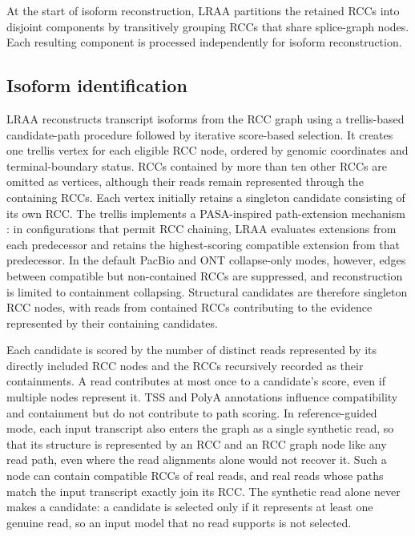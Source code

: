 At the start of isoform reconstruction, LRAA partitions the retained RCCs into disjoint components by transitively grouping RCCs that share splice-graph nodes. Each resulting component is processed independently for isoform reconstruction.

\subsection{Isoform identification}\label{isoform-identification}

LRAA reconstructs transcript isoforms from the RCC graph using a trellis-based candidate-path procedure followed by iterative score-based selection. It creates one trellis vertex for each eligible RCC node, ordered by genomic coordinates and terminal-boundary status. RCCs contained by more than ten other RCCs are omitted as vertices, although their reads remain represented through the containing RCCs. Each vertex initially retains a singleton candidate consisting of its own RCC. The trellis implements a PASA-inspired path-extension mechanism \citep{haas2003}: in configurations that permit RCC chaining, LRAA evaluates extensions from each predecessor and retains the highest-scoring compatible extension from that predecessor. In the default PacBio and ONT collapse-only modes, however, edges between compatible but non-contained RCCs are suppressed, and reconstruction is limited to containment collapsing. Structural candidates are therefore singleton RCC nodes, with reads from contained RCCs contributing to the evidence represented by their containing candidates.

Each candidate is scored by the number of distinct reads represented by its directly included RCC nodes and the RCCs recursively recorded as their containments. A read contributes at most once to a candidate's score, even if multiple nodes represent it. TSS and PolyA annotations influence compatibility and containment but do not contribute to path scoring. In reference-guided mode, each input transcript also enters the graph as a single synthetic read, so that its structure is represented by an RCC and an RCC graph node like any read path, even where the read alignments alone would not recover it. Such a node can contain compatible RCCs of real reads, and real reads whose paths match the input transcript exactly join its RCC. The synthetic read alone never makes a candidate: a candidate is selected only if it represents at least one genuine read, so an input model that no read supports is not selected.

